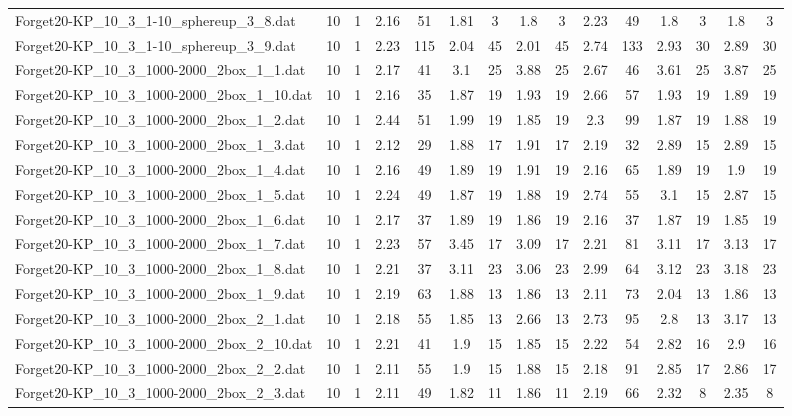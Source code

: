 \begin{table}[!ht]
{\begin{tabular}{lcccccccccccccc}
Forget20-KP\_10\_3\_1-10\_sphereup\_3\_8.dat & 10 & 1 & 2.16 & 51 & 1.81 & 3 & 1.8 & 3 & 2.23 & 49 & 1.8 & 3 & 1.8 & 3 \\
Forget20-KP\_10\_3\_1-10\_sphereup\_3\_9.dat & 10 & 1 & 2.23 & 115 & 2.04 & 45 & 2.01 & 45 & 2.74 & 133 & 2.93 & 30 & 2.89 & 30 \\
Forget20-KP\_10\_3\_1000-2000\_2box\_1\_1.dat & 10 & 1 & 2.17 & 41 & 3.1 & 25 & 3.88 & 25 & 2.67 & 46 & 3.61 & 25 & 3.87 & 25 \\
Forget20-KP\_10\_3\_1000-2000\_2box\_1\_10.dat & 10 & 1 & 2.16 & 35 & 1.87 & 19 & 1.93 & 19 & 2.66 & 57 & 1.93 & 19 & 1.89 & 19 \\
Forget20-KP\_10\_3\_1000-2000\_2box\_1\_2.dat & 10 & 1 & 2.44 & 51 & 1.99 & 19 & 1.85 & 19 & 2.3 & 99 & 1.87 & 19 & 1.88 & 19 \\
Forget20-KP\_10\_3\_1000-2000\_2box\_1\_3.dat & 10 & 1 & 2.12 & 29 & 1.88 & 17 & 1.91 & 17 & 2.19 & 32 & 2.89 & 15 & 2.89 & 15 \\
Forget20-KP\_10\_3\_1000-2000\_2box\_1\_4.dat & 10 & 1 & 2.16 & 49 & 1.89 & 19 & 1.91 & 19 & 2.16 & 65 & 1.89 & 19 & 1.9 & 19 \\
Forget20-KP\_10\_3\_1000-2000\_2box\_1\_5.dat & 10 & 1 & 2.24 & 49 & 1.87 & 19 & 1.88 & 19 & 2.74 & 55 & 3.1 & 15 & 2.87 & 15 \\
Forget20-KP\_10\_3\_1000-2000\_2box\_1\_6.dat & 10 & 1 & 2.17 & 37 & 1.89 & 19 & 1.86 & 19 & 2.16 & 37 & 1.87 & 19 & 1.85 & 19 \\
Forget20-KP\_10\_3\_1000-2000\_2box\_1\_7.dat & 10 & 1 & 2.23 & 57 & 3.45 & 17 & 3.09 & 17 & 2.21 & 81 & 3.11 & 17 & 3.13 & 17 \\
Forget20-KP\_10\_3\_1000-2000\_2box\_1\_8.dat & 10 & 1 & 2.21 & 37 & 3.11 & 23 & 3.06 & 23 & 2.99 & 64 & 3.12 & 23 & 3.18 & 23 \\
Forget20-KP\_10\_3\_1000-2000\_2box\_1\_9.dat & 10 & 1 & 2.19 & 63 & 1.88 & 13 & 1.86 & 13 & 2.11 & 73 & 2.04 & 13 & 1.86 & 13 \\
Forget20-KP\_10\_3\_1000-2000\_2box\_2\_1.dat & 10 & 1 & 2.18 & 55 & 1.85 & 13 & 2.66 & 13 & 2.73 & 95 & 2.8 & 13 & 3.17 & 13 \\
Forget20-KP\_10\_3\_1000-2000\_2box\_2\_10.dat & 10 & 1 & 2.21 & 41 & 1.9 & 15 & 1.85 & 15 & 2.22 & 54 & 2.82 & 16 & 2.9 & 16 \\
Forget20-KP\_10\_3\_1000-2000\_2box\_2\_2.dat & 10 & 1 & 2.11 & 55 & 1.9 & 15 & 1.88 & 15 & 2.18 & 91 & 2.85 & 17 & 2.86 & 17 \\
Forget20-KP\_10\_3\_1000-2000\_2box\_2\_3.dat & 10 & 1 & 2.11 & 49 & 1.82 & 11 & 1.86 & 11 & 2.19 & 66 & 2.32 & 8 & 2.35 & 8 \\

\end{tabular}}
\end{table}
